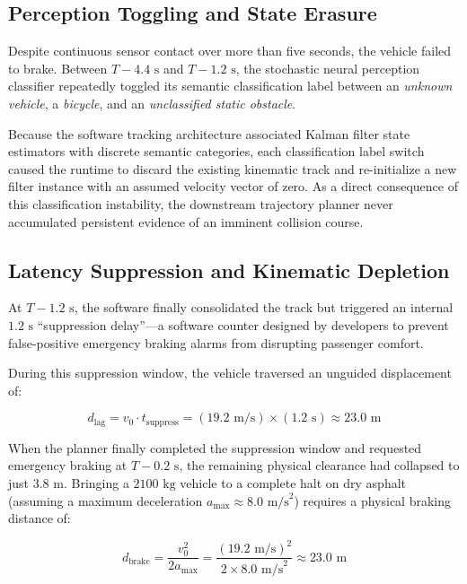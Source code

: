 \documentclass[
  10pt,
  letterpaper,
  twoside,
  openright,
  numbers=noenddot,
  headings=standardclasses
]{scrbook}
\begin{document}
\subsection{Perception Toggling and State
Erasure}\label{perception-toggling-and-state-erasure}

Despite continuous sensor contact over more than five seconds, the
vehicle failed to brake. Between \(T - 4.4\text{ s}\) and
\(T - 1.2\text{ s}\), the stochastic neural perception classifier
repeatedly toggled its semantic classification label between an
\emph{unknown vehicle}, a \emph{bicycle}, and an \emph{unclassified
static obstacle}.

Because the software tracking architecture associated Kalman filter
state estimators with discrete semantic categories, each classification
label switch caused the runtime to discard the existing kinematic track
and re-initialize a new filter instance with an assumed velocity vector
of zero. As a direct consequence of this classification instability, the
downstream trajectory planner never accumulated persistent evidence of
an imminent collision course.

\subsection{Latency Suppression and Kinematic
Depletion}\label{latency-suppression-and-kinematic-depletion}

At \(T - 1.2\text{ s}\), the software finally consolidated the track but
triggered an internal \(1.2\text{ s}\) ``suppression delay''---a
software counter designed by developers to prevent false-positive
emergency braking alarms from disrupting passenger comfort.

During this suppression window, the vehicle traversed an unguided
displacement of:

\[d_{\text{lag}} = v_0 \cdot t_{\text{suppress}} = (19.2\text{ m/s}) \times (1.2\text{ s}) \approx 23.0\text{ m}\]

When the planner finally completed the suppression window and requested
emergency braking at \(T - 0.2\text{ s}\), the remaining physical
clearance had collapsed to just \(3.8\text{ m}\). Bringing a
\(2100\text{ kg}\) vehicle to a complete halt on dry asphalt (assuming a
maximum deceleration \(a_{\max} \approx 8.0\text{ m/s}^2\)) requires a
physical braking distance of:

\[d_{\text{brake}} = \frac{v_0^2}{2 a_{\max}} = \frac{(19.2\text{ m/s})^2}{2 \times 8.0\text{ m/s}^2} \approx 23.0\text{ m}\]
\end{document}
